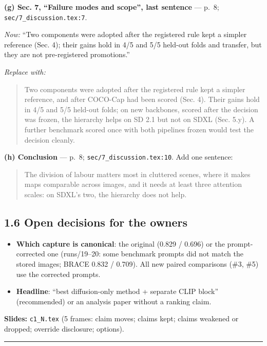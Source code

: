 \documentclass[
  10pt,
]{article}
\providecommand{\tightlist}{%
  \setlength{\itemsep}{0pt}\setlength{\parskip}{0pt}}
\begin{document}
\textbf{(g) Sec. 7, ``Failure modes and scope'', last sentence} ---
p.~8; \texttt{sec/7\_discussion.tex:7}.

\emph{Now:} ``Two components were adopted after the registered rule kept
a simpler reference (Sec. 4); their gains hold in 4/5 and 5/5 held-out
folds and transfer, but they are not pre-registered promotions.''

\emph{Replace with:}

\begin{quote}
Two components were adopted after the registered rule kept a simpler
reference, and after COCO-Cap had been scored (Sec. 4). Their gains hold
in 4/5 and 5/5 held-out folds; on new backbones, scored after the
decision was frozen, the hierarchy helps on SD 2.1 but not on SDXL (Sec.
5.y). A further benchmark scored once with both pipelines frozen would
test the decision cleanly.
\end{quote}

\textbf{(h) Conclusion} --- p.~8; \texttt{sec/7\_discussion.tex:10}. Add
one sentence:

\begin{quote}
The division of labour matters most in cluttered scenes, where it makes
maps comparable across images, and it needs at least three attention
scales: on SDXL's two, the hierarchy does not help.
\end{quote}

\subsection{1.6 Open decisions for the owners}

\begin{itemize}
\tightlist
\item
  \textbf{Which capture is canonical}: the original (0.829 / 0.696) or
  the prompt-corrected one (runs/19--20: some benchmark prompts did not
  match the stored images; BRACE 0.832 / 0.709). All new paired
  comparisons (\#3, \#5) use the corrected prompts.
\item
  \textbf{Headline}: ``best diffusion-only method + separate CLIP
  block'' (recommended) or an analysis paper without a ranking claim.
\end{itemize}

\textbf{Slides:} \texttt{c1\_N.tex} (5 frames: claim moves; claims kept;
claims weakened or dropped; override disclosure; options).

\begin{center}\rule{0.5\linewidth}{0.5pt}\end{center}
\end{document}
